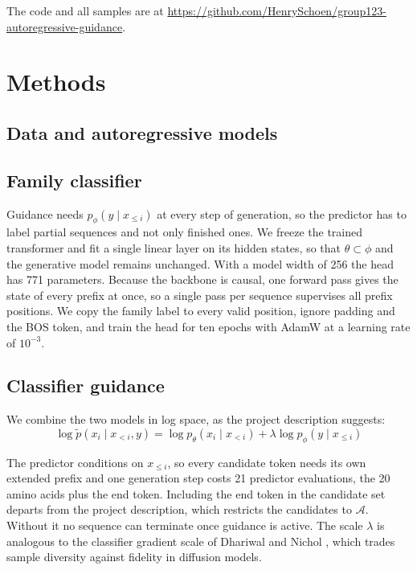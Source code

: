 \documentclass{article}
\begin{document}
The code and all samples are at \url{https://github.com/HenrySchoen/group123-autoregressive-guidance}.

\section{Methods}
\label{sec:methods}

\subsection{Data and autoregressive models}
\label{ssec:models}


\subsection{Family classifier}
\label{ssec:classifier}

Guidance needs $p_\phi(y \mid x_{\leq i})$ at every step of generation, so the predictor has to label partial sequences and not only finished ones.
We freeze the trained transformer and fit a single linear layer on its hidden states, so that $\theta \subset \phi$ and the generative model remains unchanged.
With a model width of 256 the head has 771 parameters.
Because the backbone is causal, one forward pass gives the state of every prefix at once, so a single pass per sequence supervises all prefix positions.
We copy the family label to every valid position, ignore padding and the BOS token, and train the head for ten epochs with AdamW at a learning rate of $10^{-3}$.

\subsection{Classifier guidance}
\label{ssec:guidance}

We combine the two models in log space, as the project description suggests:
\begin{equation}
  \log \tilde{p}(x_i \mid x_{<i}, y) = \log p_\theta(x_i \mid x_{<i}) + \lambda \log p_\phi(y \mid x_{\leq i})
  \label{eq:guidance}
\end{equation}

The predictor conditions on $x_{\leq i}$, so every candidate token needs its own extended prefix and one generation step costs 21 predictor evaluations, the 20 amino acids plus the end token.
Including the end token in the candidate set departs from the project description, which restricts the candidates to $\mathcal{A}$.
Without it no sequence can terminate once guidance is active.
The scale $\lambda$ is analogous to the classifier gradient scale of Dhariwal and Nichol \cite{dhariwal2021diffusion}, which trades sample diversity against fidelity in diffusion models.
\end{document}
